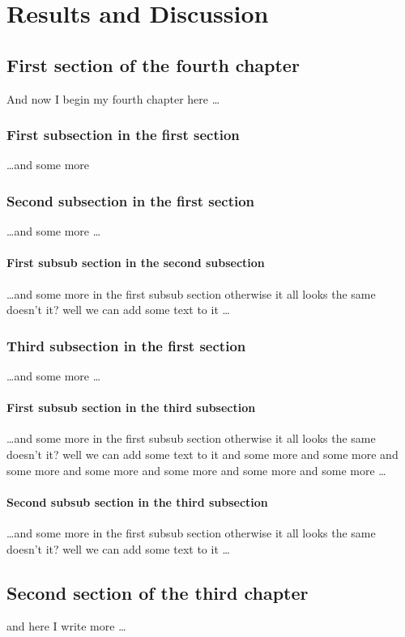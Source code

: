 \chapter{Results and Discussion}


\section{First section of the fourth chapter}
And now I begin my fourth chapter here \dots

   
\subsection{First subsection in the first section}
\dots and some more 

\subsection{Second subsection in the first section}
\dots and some more \dots

\subsubsection{First subsub section in the second subsection}
\dots and some more in the first subsub section otherwise it all looks the same doesn't it? well we can add some text to it \dots

\subsection{Third subsection in the first section}
\dots and some more \dots

\subsubsection{First subsub section in the third subsection}
\dots and some more in the first subsub section otherwise it all looks the same doesn't it? well we can add some text to it and some more and some more and some more and some more and some more and some more and some more \dots

\subsubsection{Second subsub section in the third subsection}
\dots and some more in the first subsub section otherwise it all looks the same doesn't it? well we can add some text to it \dots

\section{Second section of the third chapter}
and here I write more \dots
